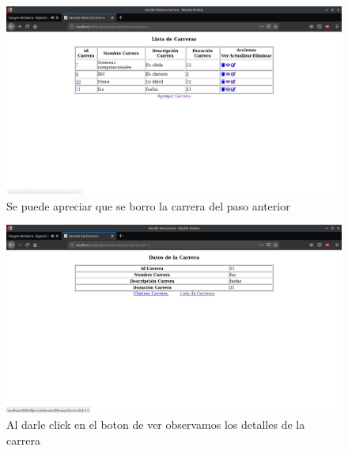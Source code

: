 \documentclass[a4paper,12pt]{article}
\begin{document}
\begin{figure}[H]
\begin{center}
 \includegraphics[width=\textwidth]{img/ver1.png}
 \caption{Se puede apreciar que se borro la carrera del paso anterior}
 \label{fig:ver1}
\end{center}
\end{figure}

\begin{figure}[H]
\begin{center}
 \includegraphics[width=\textwidth]{img/ver2.png}
 \caption{Al darle click en el boton de ver observamos los detalles de la 
carrera}
 \label{fig:ver2}
\end{center}
\end{figure}
\end{document}
